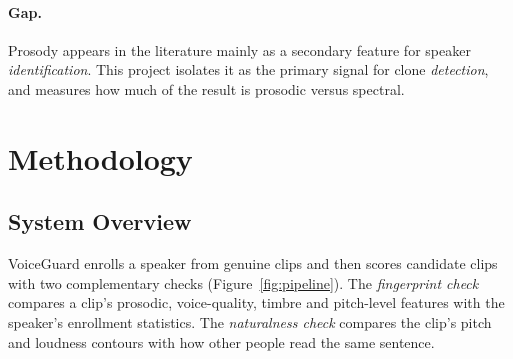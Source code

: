 \documentclass[11pt,a4paper]{article}
\begin{document}
\paragraph{Gap.} Prosody appears in the literature mainly as a secondary feature for speaker \emph{identification}. This project isolates it as the primary signal for clone \emph{detection}, and measures how much of the result is prosodic versus spectral.

\section{Methodology}

\subsection{System Overview}
VoiceGuard enrolls a speaker from genuine clips and then scores candidate clips with two complementary checks (Figure~\ref{fig:pipeline}). The \emph{fingerprint check} compares a clip's prosodic, voice-quality, timbre and pitch-level features with the speaker's enrollment statistics. The \emph{naturalness check} compares the clip's pitch and loudness contours with how other people read the same sentence.
\end{document}
